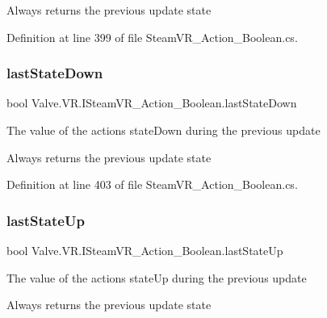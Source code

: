 Always returns the previous update state

Definition at line 399 of file Steam\+V\+R\+\_\+\+Action\+\_\+\+Boolean.\+cs.

\mbox{\label{interface_valve_1_1_v_r_1_1_i_steam_v_r___action___boolean_a108dd7a0603097b3a433876afc978b44}} 
\subsubsection{\texorpdfstring{lastStateDown}{lastStateDown}}
{\footnotesize\ttfamily bool Valve.\+V\+R.\+I\+Steam\+V\+R\+\_\+\+Action\+\_\+\+Boolean.\+last\+State\+Down\hspace{0.3cm}{\ttfamily [get]}}



The value of the action\textquotesingle{}s \textquotesingle{}state\+Down\textquotesingle{} during the previous update 

Always returns the previous update state

Definition at line 403 of file Steam\+V\+R\+\_\+\+Action\+\_\+\+Boolean.\+cs.

\mbox{\label{interface_valve_1_1_v_r_1_1_i_steam_v_r___action___boolean_a86e9cd96c0f19eadfe03b79a33c4e7f4}} 
\subsubsection{\texorpdfstring{lastStateUp}{lastStateUp}}
{\footnotesize\ttfamily bool Valve.\+V\+R.\+I\+Steam\+V\+R\+\_\+\+Action\+\_\+\+Boolean.\+last\+State\+Up\hspace{0.3cm}{\ttfamily [get]}}



The value of the action\textquotesingle{}s \textquotesingle{}state\+Up\textquotesingle{} during the previous update 

Always returns the previous update state

